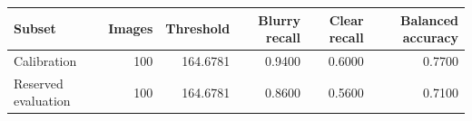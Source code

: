 \begin{tabular}{lrrrrr}
\toprule
Subset & Images & Threshold & Blurry recall & Clear recall & Balanced accuracy \\
\midrule
Calibration & 100 & 164.6781 & 0.9400 & 0.6000 & 0.7700 \\
Reserved evaluation & 100 & 164.6781 & 0.8600 & 0.5600 & 0.7100 \\
\bottomrule
\end{tabular}
